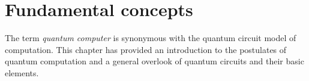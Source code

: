 \chapter{Fundamental concepts}
The term \emph{quantum computer} is synonymous with the quantum circuit model of computation. This chapter has provided an introduction to the postulates of quantum computation and a general overlook of quantum circuits and their basic elements.


